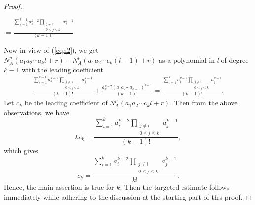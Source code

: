 \documentclass[10pt,a4paper]{amsart}
\begin{document}
\begin{proof}
\begin{flushleft}
\end{flushleft}
\begin{flushright} 
$=\frac{\sum_{s=1}^{k-1}a_s^{k-2}\prod_{\substack{j\neq s\\ 0\leq j\leq k}}a_j^{k-1}}{(k-1)!}.\ \ \ \ \ \ \ \ \ \ \ \ $
\end{flushright}
Now in view of (\ref{eqn2}), we get $N_A^p(a_1a_2\cdots a_kl+r)-N_A^p(a_1a_2\cdots a_k(l-1)+r)$ as a polynomial in $l$ of degree $k-1$ with the leading coefficient
\begin{align*}
\frac{\sum_{s=1}^{k-1}a_s^{k-2}\prod_{\substack{j\neq s\\ 0\leq j\leq k}}a_j^{k-1}}{(k-1)!}+\frac{a_k^{k-2}(a_1a_2\cdots a_{k-1})^{k-1}}{(k-1)!}=\frac{\sum_{i=1}^{k}a_i^{k-2}\prod_{\substack{j\neq i\\ 0\leq j\leq k}}a_j^{k-1}}{(k-1)!}.
\end{align*} 
Let $c_k$ be the leading coefficient of $N_A^p(a_1a_2\cdots a_kl+r)$. Then from the above observations, we have
\[kc_k=\frac{\sum_{i=1}^{k}a_i^{k-2}\prod_{\substack{j\neq i\\ 0\leq j\leq k}}a_j^{k-1}}{(k-1)!},
\] 
which gives 
\[c_k=\frac{\sum_{i=1}^{k}a_i^{k-2}\prod_{\substack{j\neq i\\ 0\leq j\leq k}}a_j^{k-1}}{k!}.
\] 
Hence, the main assertion is true for $k$. Then the targeted estimate follows immediately while adhering to the discussion at the starting part of this proof. 
\end{proof}
\end{document}
